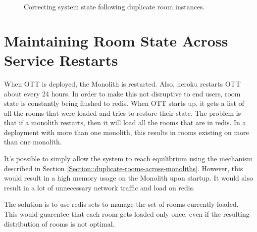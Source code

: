 \begin{figure}[!htb]
  \centering
  \caption{\label{Figure::duplicate-rooms} Correcting system state following duplicate room instances.}
\end{figure}

\section{Maintaining Room State Across Service Restarts}

When OTT is deployed, the Monolith is restarted. Also, heroku restarts OTT about every 24 hours. In order to make this not disruptive to end users, room state is constantly being flushed to redis. When OTT starts up, it gets a list of all the rooms that were loaded and tries to restore their state. The problem is that if a monolith restarts, then it will load all the rooms that are in redis. In a deployment with more than one monolith, this results in rooms existing on more than one monolith.

It's possible to simply allow the system to reach equilibrium using the mechanism described in Section \ref{Section::duplicate-rooms-across-monoliths}. However, this would result in a high memory usage on the Monolith upon startup. It would also result in a lot of unnecessary network traffic and load on redis.

The solution is to use redis sets\cite{redis-sets} to manage the set of rooms currently loaded. This would guarentee that each room gets loaded only once, even if the resulting distribution of rooms is not optimal.

